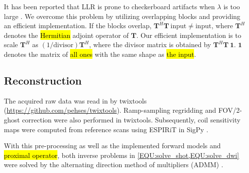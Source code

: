\documentclass[preprint,12pt,authoryear,review]{elsarticle}
\begin{document}
    It has been reported that LLR is prone to checkerboard artifacts
    when $\lambda$ is too large \citep{hu_2020_spa_llr}.
    We overcome this problem by utilizing overlapping blocks and providing an efficient implementation.
    If the blocks overlap, $\mathbf{T}^H \mathbf{T}~\mathrm{input} \neq \mathrm{input}$,
    where $\mathbf{T}^H$ denotes the \hl{Hermitian} adjoint operator of $\mathbf{T}$.
    Our efficient implementation is to scale $\mathbf{T}^H$
    as $(1 / \mathrm{divisor})\mathbf{T}^H$,
    where the divisor matrix is obtained by $\mathbf{T}^H \mathbf{T}~\mathbf{1}$.
    $\mathbf{1}$ denotes the matrix of \hl{all ones} 
    with the same shape as \hl{the input}. 

    \subsection{Reconstruction}

    The acquired raw data was read in by twixtools
    (\url{https://github.com/pehses/twixtools}).
    Ramp-sampling regridding and FOV/2-ghost correction were also performed in twixtools.
    Subsequently, coil sensitivity maps were computed from reference scans
    using ESPIRiT \citep{uecker_2014_espirit} in SigPy \citep{ong_2019_sigpy}.

    With this pre-processing as well as
    the implemented forward models and \hl{proximal operator},
    both inverse problems in \cref{EQU:solve_shot,EQU:solve_dwi} were solved by
    the alternating direction method of multipliers (ADMM) \citep{boyd_2010_admm}.
\end{document}
